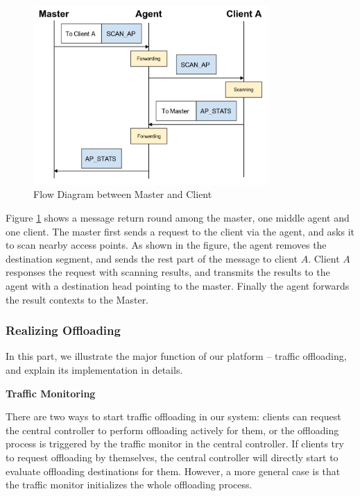 \documentclass[english]{tktltiki}
\begin{document}
\begin{figure}[htbp]
  \centering
  \includegraphics[width=0.8\textwidth]{images/flow.png}
  \caption{Flow Diagram between Master and Client}
  \label{fig:flow}
\end{figure}

Figure \ref{fig:flow} shows a message return round among the master, one middle agent and one client. The master first sends a request to the client via the agent, and asks it to scan nearby access points. As shown in the figure, the agent removes the destination segment, and sends the rest part of the message to client $A$. Client $A$ responses the request with scanning results, and transmits the results to the agent with a destination head pointing to the master. Finally the agent forwards the result contexts to the Master. 


\subsubsection{Realizing Offloading}

In this part, we illustrate the major function of our platform -- traffic offloading, and explain its implementation in details.


\vspace{1mm}

\textbf{Traffic Monitoring}

\vspace{1mm}


There are two ways to start traffic offloading in our system: clients can request the central controller to perform offloading actively for them, or the offloading process is triggered by the traffic monitor in the central controller. If clients try to request offloading by themselves, the central controller will directly start to evaluate offloading destinations for them. However, a more general case is that the traffic monitor initializes the whole offloading process.
\end{document}
